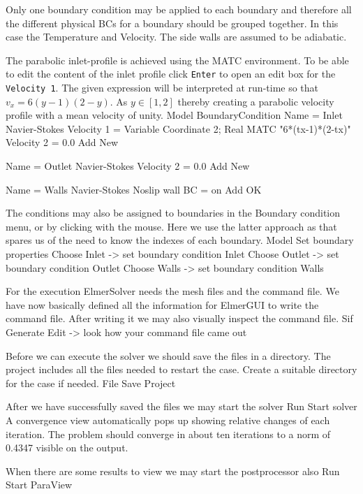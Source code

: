 Only one boundary condition may be applied to each boundary and therefore all the 
different physical BCs for a boundary should be grouped together. In this case the
Temperature and Velocity. The side walls are assumed to be adiabatic.

The parabolic inlet-profile is achieved using the 
MATC environment. To be able to edit the content of the inlet profile 
click \texttt{Enter} to open an edit box for the \texttt{Velocity 1}. The given expression will be 
interpreted at run-time so that $v_x=6(y-1)(2-y)$. As $y\in[1,2]$ thereby
creating a parabolic velocity profile with a mean velocity of unity. 
\ttbegin
Model
  BoundaryCondition
    Name = Inlet
    Navier-Stokes 
      Velocity 1 = Variable Coordinate 2; Real MATC "6*(tx-1)*(2-tx)"
      Velocity 2 = 0.0
    Add
    New

    Name = Outlet
    Navier-Stokes 
      Velocity 2 = 0.0
    Add 
    New
 
    Name = Walls
    Navier-Stokes 
      Noslip wall BC = on
    Add
    OK
\ttend   

The conditions may also be assigned to boundaries in the Boundary condition menu, or 
by clicking with the mouse. Here we use the latter approach as that spares us of the 
need to know the indexes of each boundary.
\ttbegin
Model
  Set boundary properties
    Choose Inlet -> set boundary condition Inlet
    Choose Outlet -> set boundary condition Outlet
    Choose Walls -> set boundary condition Walls
\ttend

For the execution 
ElmerSolver needs the mesh files and the command file. We have now basically defined
all the information for ElmerGUI to write the command file. After writing it we may also visually 
inspect the command file.
\ttbegin
Sif 
  Generate
  Edit -> look how your command file came out  
\ttend

Before we can execute the solver we should save the files in a directory. The project includes
all the files needed to restart the case. Create a suitable directory for the case if needed. 
\ttbegin
File 
  Save Project
\ttend

After we have successfully saved the files we may start the solver
\ttbegin
Run
  Start solver
\ttend
A convergence view automatically pops up showing relative changes of each iteration.
The problem should converge in about ten iterations to a norm of 0.4347 visible on the output.

When there are some results to view we may start the postprocessor also
\ttbegin
Run
  Start ParaView
\ttend


